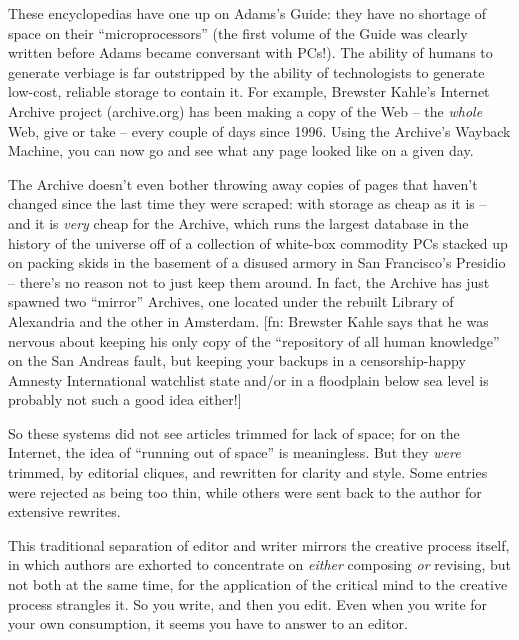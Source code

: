 These encyclopedias have one up on Adams's Guide: they have no
shortage of space on their ``microprocessors'' (the first volume of
the Guide was clearly written before Adams became conversant with
PCs!). The ability of humans to generate verbiage is far
outstripped by the ability of technologists to generate low-cost,
reliable storage to contain it. For example, Brewster Kahle's
Internet Archive project (archive.org) has been making a copy of
the Web -- the \emph{whole} Web, give or take -- every couple of
days since 1996. Using the Archive's Wayback Machine, you can now
go and see what any page looked like on a given day.

The Archive doesn't even bother throwing away copies of pages that
haven't changed since the last time they were scraped: with storage
as cheap as it is -- and it is \emph{very} cheap for the Archive,
which runs the largest database in the history of the universe off
of a collection of white-box commodity PCs stacked up on packing
skids in the basement of a disused armory in San Francisco's
Presidio -- there's no reason not to just keep them around. In
fact, the Archive has just spawned two ``mirror'' Archives, one
located under the rebuilt Library of Alexandria and the other in
Amsterdam. [fn: Brewster Kahle says that he was nervous about
keeping his only copy of the ``repository of all human knowledge'' on
the San Andreas fault, but keeping your backups in a
censorship-happy Amnesty International watchlist state and/or in a
floodplain below sea level is probably not such a good idea
either!]

So these systems did not see articles trimmed for lack of space;
for on the Internet, the idea of ``running out of space'' is
meaningless. But they \emph{were} trimmed, by editorial cliques,
and rewritten for clarity and style. Some entries were rejected as
being too thin, while others were sent back to the author for
extensive rewrites.

This traditional separation of editor and writer mirrors the
creative process itself, in which authors are exhorted to
concentrate on \emph{either} composing \emph{or} revising, but
not both at the same time, for the application of the critical mind
to the creative process strangles it. So you write, and then you
edit. Even when you write for your own consumption, it seems you
have to answer to an editor.

